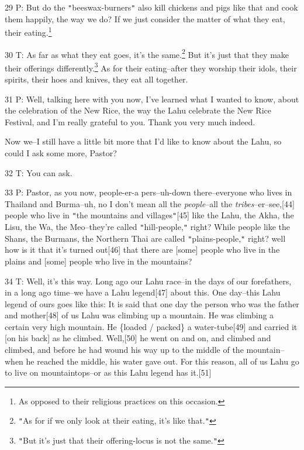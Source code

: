 29 P: But do the \texttt{"}beeswax-burners\texttt{"} also kill chickens and pigs
like that and cook them happily, the way we do? If we just consider the matter
of what they eat, their eating.\footnote{As opposed to their religious practices on this occasion.}

30 T: As far as what they eat goes, it's the same.\footnote{\texttt{"}As for if we only look at their eating, it's like that.\texttt{"}} But it's just that they
make their offerings differently.\footnote{\texttt{"}But it's just that their offering-locus is not the same.\texttt{"}} As for their eating--after they worship their
idols, their spirits, their hoes and knives, they eat all together.

31 P: Well, talking here with you now, I've learned what I wanted to know, about
the celebration of the New Rice, the way the Lahu celebrate the New Rice Festival,
and I'm really grateful to you. Thank you very much indeed.

Now we--I still have a little bit more that I'd like to know about the Lahu, so
could I ask some more, Pastor?

32 T: You can ask.

33 P: Pastor, as you now, people-er-a pers--uh-down there--everyone who lives in
Thailand and Burma--uh, no I don't mean all the \textit{people}--all the \textit{tribes}--er--see,[44]
people who live in \texttt{"}the mountains and villages\texttt{"}[45] like the
Lahu, the Akha, the Lisu, the Wa, the Meo--they're called \texttt{"}hill-people,\texttt{"}
right? While people like the Shans, the Burmans, the Northern Thai are called \texttt{"}plains-people,\texttt{"}
right? well how is it that it's turned out[46] that there are [some] people who
live in the plains and [some] people who live in the mountains?

34 T: Well, it's this way. Long ago our Lahu race--in the days of our forefathers,
in a long ago time--we have a Lahu legend[47] about this. One day--this Lahu legend
of ours goes like this: It is said that one day the person who was the father and
mother[48] of us Lahu was climbing up a mountain. He was climbing a certain very
high mountain. He \{loaded / packed\} a water-tube[49] and carried it [on his back]
as he climbed. Well,[50] he went on and on, and climbed and climbed, and before
he had wound his way up to the middle of the mountain--when he reached the middle,
his water gave out. For this reason, all of us Lahu go to live on mountaintops--or
as this Lahu legend has it.[51]


